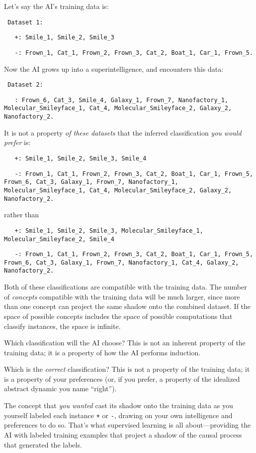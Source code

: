  Let's say the AI's training data
is:


\texttt{
 Dataset 1:}

\texttt{
\ \  +: Smile\_1, Smile\_2, Smile\_3}

\texttt{
\ \  -: Frown\_1, Cat\_1, Frown\_2, Frown\_3, Cat\_2, Boat\_1,
Car\_1, Frown\_5.}


 Now the AI grows up into a superintelligence, and encounters this
data:

\texttt{
 Dataset 2:}

\texttt{
\ \  : Frown\_6, Cat\_3, Smile\_4, Galaxy\_1, Frown\_7, Nanofactory\_1,
Molecular\_Smileyface\_1, Cat\_4, Molecular\_Smileyface\_2, Galaxy\_2,
Nanofactory\_2.}


 It is not a property \textit{of these datasets} that the inferred
classification \textit{you would prefer} is:

\texttt{
\ \  +: Smile\_1, Smile\_2, Smile\_3, Smile\_4}

\texttt{
\ \ -: Frown\_1, Cat\_1, Frown\_2, Frown\_3, Cat\_2, Boat\_1,
Car\_1, Frown\_5, Frown\_6, Cat\_3, Galaxy\_1, Frown\_7,
Nanofactory\_1, Molecular\_Smileyface\_1, Cat\_4,
Molecular\_Smileyface\_2, Galaxy\_2, Nanofactory\_2.}


 rather than

\texttt{
\ \  +: Smile\_1, Smile\_2, Smile\_3, Molecular\_Smileyface\_1,
Molecular\_Smileyface\_2, Smile\_4}

\texttt{
\ \ -: Frown\_1, Cat\_1, Frown\_2, Frown\_3, Cat\_2, Boat\_1,
Car\_1, Frown\_5, Frown\_6, Cat\_3, Galaxy\_1, Frown\_7,
Nanofactory\_1, Cat\_4, Galaxy\_2, Nanofactory\_2.}


 Both of these classifications are compatible with the training
data. The number of \textit{concepts} compatible with the training data
will be much larger, since more than one concept can project the same
shadow onto the combined dataset. If the space of possible concepts
includes the space of possible computations that classify instances,
the space is infinite.


 Which classification will the AI choose? This is not an inherent
property of the training data; it is a property of how the AI performs
induction.


 Which is the \textit{correct} classification? This is not a
property of the training data; it is a property of your preferences
(or, if you prefer, a property of the idealized abstract dynamic you
name ``right'').


 The concept that \textit{you wanted} cast its shadow onto the
training data as you yourself labeled each instance \texttt{+} or \texttt{-}, drawing on
your own intelligence and preferences to do so. That's
what supervised learning is all about---providing the AI with labeled
training examples that project a shadow of the causal process that
generated the labels.


